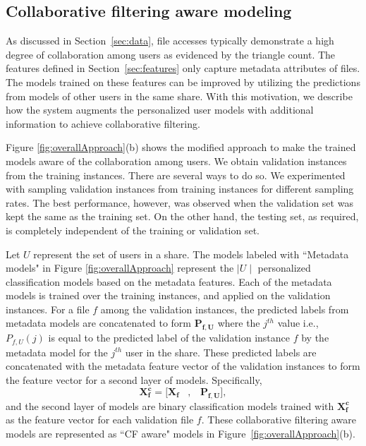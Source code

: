 \subsection{Collaborative filtering aware modeling}
\label{sec:collabfiltering}
As discussed in Section~\ref{sec:data}, file accesses typically
demonstrate a high degree of collaboration among users as evidenced by
the triangle count. The features defined in Section~\ref{sec:features}
only capture metadata attributes of files. The models trained on these
features can be improved by utilizing the predictions from models of
other users in the same share. With this motivation, we describe how the
system augments the personalized user models with additional
information to achieve collaborative filtering.

Figure \ref{fig:overallApproach}(b) shows the modified approach to
make the trained models aware of the collaboration among users. We
obtain validation instances from the training instances. There are
several ways to do so. We experimented with sampling validation
instances from training instances for different sampling rates. The
best performance, however, was observed when the validation set was
kept the same as the training set.
On the other hand, the testing set, as required, is completely
independent of the training or validation set.


Let $U$ represent the set of users in a share. The models labeled with
``Metadata models" in Figure \ref{fig:overallApproach} represent the
$\mid U \mid$ personalized classification models based on the metadata
features. Each of the metadata models is trained over the training
instances, and applied on the validation instances. For a file $f$
among the validation instances, the predicted labels from metadata
models are concatenated to form $\mathbf{P_{f,U}}$ where the $j^{th}$
value i.e., $P_{f,U}(j)$ is equal to the predicted label of the
validation instance $f$ by the metadata model for the $j^{th}$ user in
the share. These predicted labels are concatenated with the metadata
feature vector of the validation instances to form the feature vector
for a second layer of models. Specifically,
\begin{equation}
\label{eq:featurevectorCollab}
\mathbf{X^{c}_f} = \lbrack  \mathbf{X_f}  \; \; \; , \;  \;  \;  \mathbf{P_{f,U}}     \rbrack, 
\end{equation}
and the second layer of models are binary classification models
trained with $\mathbf{X^{c}_f}$ as the feature vector for each
validation file $f$. These collaborative filtering aware models are
represented as ``CF aware" models in
Figure~\ref{fig:overallApproach}(b).


